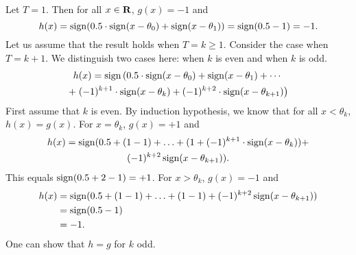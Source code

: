 Let $T = 1$. Then for all $x \in \mathbf{R}$, $g(x) = -1$ and   
\[
h(x) = \operatorname{sign}(0.5 \cdot \operatorname{sign}(x - \theta_0) + \operatorname{sign}(x - \theta_1)) 
     = \operatorname{sign}(0.5 - 1) = -1.
\]
Let us assume that the result holds when $T = k \geq 1$. 
Consider the case when $T = k + 1$. 
We distinguish two cases here: when $k$ is even and when $k$ is odd. 
\begin{multline*}
    h(x) =  \operatorname{sign} \left ( 0.5 \cdot \operatorname{sign} (x - \theta_{0}) 
            + \operatorname{sign}(x - \theta_1) 
            + \cdots \right . \\ 
            + \left . (-1)^{k + 1} \cdot \operatorname{sign}(x - \theta_k) 
            + (-1)^{k + 2} \cdot \operatorname{sign}(x - \theta_{k + 1}) \right )
\end{multline*}
First assume that $k$ is even. By induction hypothesis, we know that 
for all $x < \theta_{k}$, $h(x) = g(x)$. For $x = \theta_k$, $g(x) = +1$
and 
\begin{multline*}
h(x) = \operatorname{sign}( 0.5 + (1 - 1) + \ldots + (1 + (-1)^{k + 1} \cdot \operatorname{sign}(x - \theta_k)) + \\ 
       (-1)^{k + 2} \operatorname{sign}(x - \theta_{k + 1})). 
\end{multline*}
This equals $\operatorname{sign}(0.5 + 2 - 1) = +1$. 
For $x > \theta_{k}$, $g(x) = -1$ and 
\begin{align*}
    h(x) & = \operatorname{sign}(0.5 + (1 - 1) + \ldots + (1 - 1) + (-1)^{k + 2} 
             \operatorname{sign}(x - \theta_{k + 1})) \\
         & = \operatorname{sign}(0.5 - 1) \\
         & = -1.
\end{align*}
One can show that $h = g$ for $k$ odd. 

